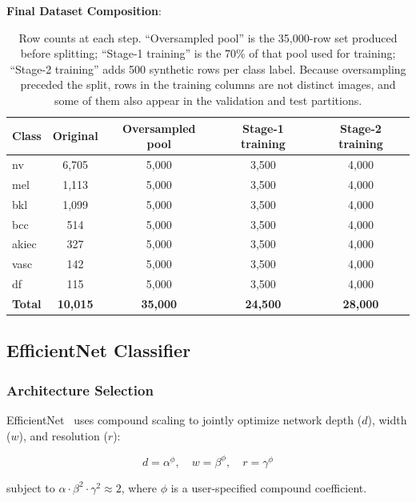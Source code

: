 \documentclass[ai,article,submit,pdftex,moreauthors]{Definitions/mdpi}
\begin{document}
\textbf{Final Dataset Composition}:
\begin{table}[H]
\caption{Row counts at each step. ``Oversampled pool'' is the 35,000-row set produced before splitting; ``Stage-1 training'' is the 70\% of that pool used for training; ``Stage-2 training'' adds 500 synthetic rows per class label. Because oversampling preceded the split, rows in the training columns are not distinct images, and some of them also appear in the validation and test partitions.\label{tab:augmented}}
\begin{tabularx}{\textwidth}{lCCCC}
\toprule
\textbf{Class} & \textbf{Original} & \textbf{Oversampled pool} & \textbf{Stage-1 training} & \textbf{Stage-2 training} \\
\midrule
nv & 6,705 & 5,000 & 3,500 & 4,000 \\
mel & 1,113 & 5,000 & 3,500 & 4,000 \\
bkl & 1,099 & 5,000 & 3,500 & 4,000 \\
bcc & 514 & 5,000 & 3,500 & 4,000 \\
akiec & 327 & 5,000 & 3,500 & 4,000 \\
vasc & 142 & 5,000 & 3,500 & 4,000 \\
df & 115 & 5,000 & 3,500 & 4,000 \\
\midrule
\textbf{Total} & \textbf{10,015} & \textbf{35,000} & \textbf{24,500} & \textbf{28,000} \\
\bottomrule
\end{tabularx}
\end{table}

\subsection{EfficientNet Classifier}

\subsubsection{Architecture Selection}

EfficientNet~\cite{tan2019} uses compound scaling to jointly optimize network depth ($d$), width ($w$), and resolution ($r$):

\begin{linenomath}
\begin{equation}
    d = \alpha^{\phi}, \quad w = \beta^{\phi}, \quad r = \gamma^{\phi}
\end{equation}
\end{linenomath}
subject to $\alpha \cdot \beta^{2} \cdot \gamma^{2} \approx 2$, where $\phi$ is a user-specified compound coefficient.
\end{document}
